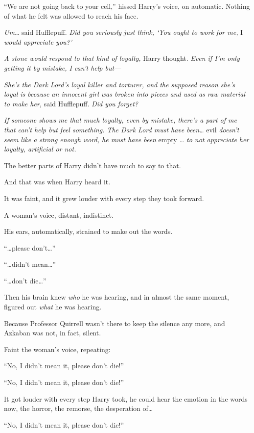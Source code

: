 ``We are not going back to your cell,'' hissed Harry's voice, on
automatic. Nothing of what he felt was allowed to reach his face.

\emph{Um\ldots{}} said Hufflepuff. \emph{Did you seriously just think,
`You ought to work for me,} I \emph{would appreciate you?'}

\emph{A stone would respond to that kind of loyalty,} Harry thought.
\emph{Even if I'm only getting it by mistake, I can't help but---}

\emph{She's the Dark Lord's loyal killer and torturer, and the supposed
reason she's loyal is because an innocent girl was broken into pieces
and used as raw material to make her,} said Hufflepuff. \emph{Did you
forget?}

\emph{If someone shows me that much loyalty, even by mistake, there's a
part of me that can't help but feel something. The Dark Lord must have
been\ldots{}} evil \emph{doesn't seem like a strong enough word, he must
have been} empty \emph{\ldots{} to not appreciate her loyalty,
artificial or not.}

The better parts of Harry didn't have much to say to that.

And that was when Harry heard it.

It was faint, and it grew louder with every step they took forward.

A woman's voice, distant, indistinct.

His ears, automatically, strained to make out the words.

``\ldots{}please don't\ldots{}''

``\ldots{}didn't mean\ldots{}''

``\ldots{}don't die\ldots{}''

Then his brain knew \emph{who} he was hearing, and in almost the same
moment, figured out \emph{what} he was hearing.

Because Professor Quirrell wasn't there to keep the silence any more,
and Azkaban was not, in fact, silent.

Faint the woman's voice, repeating:

``No, I didn't mean it, please don't die!''

``No, I didn't mean it, please don't die!''

It got louder with every step Harry took, he could hear the emotion in
the words now, the horror, the remorse, the desperation of\ldots{}

``No, I didn't mean it, please don't die!''

